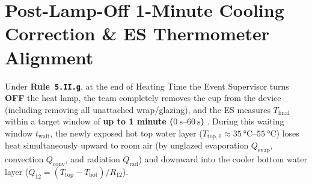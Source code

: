 \section{Post-Lamp-Off 1-Minute Cooling Correction \& ES Thermometer Alignment}\label{sec:16.4}

Under \textbf{Rule~\texttt{5.II.g}}, at the end of Heating Time the Event Supervisor turns \textbf{OFF} the heat lamp, the team completely removes the cup from the device (including removing all unattached wrap/glazing), and the ES measures $T_{\mathrm{final}}$ within a target window of \textbf{up to 1 minute ($\SIrange{0}{60}{\second}$)} . During this waiting window $t_{\mathrm{wait}}$, the newly exposed hot top water layer ($T_{\mathrm{top},0} \approx \SIrange{35}{55}{\celsius}$) loses heat simultaneously upward to room air (by unglazed evaporation $\dot{Q}_{\mathrm{evap}}$, convection $\dot{Q}_{\mathrm{conv}}$, and radiation $\dot{Q}_{\mathrm{rad}}$) and downward into the cooler bottom water layer ($\dot{Q}_{12} = (T_{\mathrm{top}} - T_{\mathrm{bot}})/R_{12}$).

